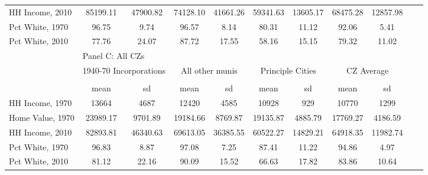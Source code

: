 \begin{tabular}{l*{10}{c}}
HH Income, 2010     &    85199.11&    47900.82&    74128.10&    41661.26&    59341.63&    13605.17&    68475.28&    12857.98\\
Pct White, 1970     &       96.75&        9.74&       96.57&        8.14&       80.31&       11.12&       92.06&        5.41\\
Pct White, 2010     &       77.76&       24.07&       87.72&       17.55&       58.16&       15.15&       79.32&       11.02\\
\toprule
&\multicolumn{8}{l}{Panel C: All CZs}\\
\cmidrule(lr){1-9}
&\multicolumn{2}{c}{1940-70 Incorporations}&\multicolumn{2}{c}{All other munis}&\multicolumn{2}{c}{Principle Cities}&\multicolumn{2}{c}{CZ Average}\\ \cmidrule(lr){2-3}  \cmidrule(lr){4-5} \cmidrule(lr){6-7} \cmidrule(lr){8-9}
                    &\multicolumn{2}{c}{}     &\multicolumn{2}{c}{}     &\multicolumn{2}{c}{}     &\multicolumn{2}{c}{}     \\
                    &        mean&          sd&        mean&          sd&        mean&          sd&        mean&          sd\\
\midrule
HH Income, 1970     &       13664&        4687&       12420&        4585&       10928&         929&       10770&        1299\\
Home Value, 1970    &    23989.17&     9701.89&    19184.66&     8769.87&    19135.87&     4885.79&    17769.27&     4186.59\\
HH Income, 2010     &    82893.81&    46340.63&    69613.05&    36385.55&    60522.27&    14829.21&    64918.35&    11982.74\\
Pct White, 1970     &       96.83&        8.87&       97.08&        7.25&       87.41&       11.22&       94.86&        4.97\\
Pct White, 2010     &       81.12&       22.16&       90.09&       15.52&       66.63&       17.82&       83.86&       10.64\\
\midrule \bottomrule \end{tabular}
